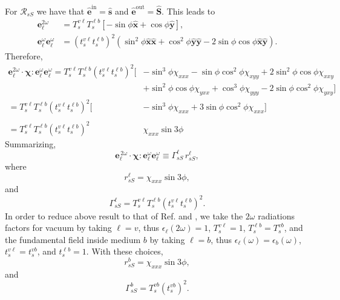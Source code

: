 For $\mathcal{R}_{sS}$ we have that
$\hat{\mathbf{e}}^{\mathrm{in}}=\hat{\mathbf{s}}$ and
$\hat{\mathbf{e}}^{\mathrm{out}}=\hat{\mathbf{S}}$. This leads to
\begin{align*}
\mathbf{e}^{2\omega}_{\ell} 
&= T^{v\ell}_{s}T^{\ell b}_{s}
\left[-\sin\phi\hat{\mathbf{x}} + \cos\phi\hat{\mathbf{y}}\right],\\
\mathbf{e}^{\omega}_{\ell}\mathbf{e}^{\omega}_{\ell}
&= \left(t^{v\ell}_{s}t^{\ell b}_{s}\right)^{2}
\left(
  \sin^{2}\phi\hat{\mathbf{x}}\hat{\mathbf{x}}
+ \cos^{2}\phi\hat{\mathbf{y}}\hat{\mathbf{y}} 
- 2\sin\phi\cos\phi\hat{\mathbf{x}}\hat{\mathbf{y}}
\right).
\end{align*}
Therefore,
\begin{equation*}
\begin{split}
\mathbf{e}^{2\omega}_{\ell}
\cdot\boldsymbol{\chi}:
\mathbf{e}^{\omega}_{\ell}\mathbf{e}^{\omega}_{\ell} =
T^{v\ell}_{s}T^{\ell b}_{s}\left(t^{v\ell}_{s}t^{\ell b}_{s}\right)^{2}
\big[&
-  \sin^{3}\phi\chi_{xxx}
-  \sin\phi\cos^{2}\phi\chi_{xyy}
+ 2\sin^{2}\phi\cos\phi\chi_{xxy}\\
&+ \sin^{2}\phi\cos\phi\chi_{yxx}
+  \cos^{3}\phi\chi_{yyy}
- 2\sin\phi\cos^{2}\phi\chi_{yxy}
\big]\\
=
T^{v\ell}_{s}T^{\ell b}_{s}\left(t^{v\ell}_{s}t^{\ell b}_{s}\right)^{2}
\big[&
-  \sin^{3}\phi\chi_{xxx}
+ 3\sin\phi\cos^{2}\phi\chi_{xxx}
\big]\\\\
=T^{v\ell}_{s}T^{\ell b}_{s}\left(t^{v\ell}_{s}t^{\ell b}_{s}\right)^{2}
\,\,\,&\chi_{xxx}\sin3\phi
\end{split}
\end{equation*}
Summarizing,
\begin{equation*}
\mathbf{e}^{\,2\omega}_{\ell}\cdot
\boldsymbol{\chi}:\mathbf{e}^\omega_{\ell}\mathbf{e}^\omega_{\ell}
\equiv\Gamma^{\ell}_{sS}\, r^{\ell}_{sS},
\end{equation*}
where
\begin{equation*}
r^{\ell}_{sS} = \chi_{xxx}\sin3\phi,
\end{equation*}
and
\begin{equation*}
\Gamma^{\ell}_{sS}=
T^{v\ell}_{s}T^{\ell b}_{s}\left(t^{v\ell}_{s}t^{\ell b}_{s}\right)^{2}.
\end{equation*} 
In order to reduce above result to that of Ref. \cite{mizrahiJOSA88} and
\cite{sipePRB87}, we take the $2\omega$ radiations factors for vacuum by
taking $\ell=v$, thus $\epsilon_{\ell}(2\omega)=1$, $T^{v\ell}_{s}=1$,
$T^{\ell b}_{s}=T^{vb}_{s}$, and the fundamental field inside medium $b$ by
taking $\ell=b$, thus $\epsilon_{\ell}(\omega)=\epsilon_{b}(\omega)$,
$t^{v\ell}_{s}=t^{vb}_{s}$, and $t^{\ell b}_{s}=1$. With these choices,
\begin{equation*}
r^{b}_{sS} = \chi_{xxx}\sin3\phi,
\end{equation*}
and 
\begin{equation*}
\Gamma^{b}_{sS} = T^{vb}_{s}\left(t^{vb}_{s}\right)^{2}.
\end{equation*} 


